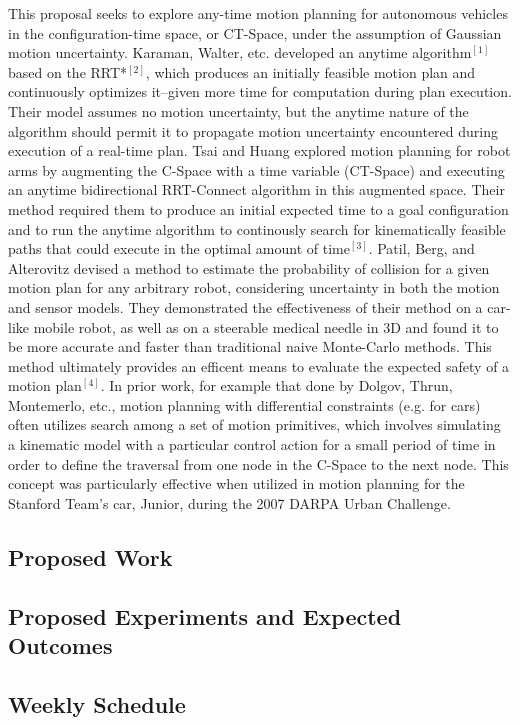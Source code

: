 \documentclass[12pt]{article}
\begin{document}
This proposal seeks to explore any-time motion planning for autonomous vehicles in the configuration-time space, or CT-Space, under the assumption of Gaussian motion uncertainty. Karaman, Walter, etc. developed an anytime algorithm$^{[1]}$ based on the RRT*$^{[2]}$, which produces an initially feasible motion plan and continuously optimizes it--given more time for computation during plan execution. Their model assumes no motion uncertainty, but the anytime nature of the algorithm should permit it to propagate motion uncertainty encountered during execution of a real-time plan. Tsai and Huang explored motion planning for robot arms by augmenting the C-Space with a time variable (CT-Space) and executing an anytime bidirectional RRT-Connect algorithm in this augmented space. Their method required them to produce an initial expected time to a goal configuration and to run the anytime algorithm to continously search for kinematically feasible paths that could execute in the optimal amount of time$^{[3]}$. Patil, Berg, and Alterovitz devised a method to estimate the probability of collision for a given motion plan for any arbitrary robot, considering uncertainty in both the motion and sensor models. They demonstrated the effectiveness of their method on a car-like mobile robot, as well as on a steerable medical needle in 3D and found it to be more accurate and faster than traditional naive Monte-Carlo methods. This method ultimately provides an efficent means to evaluate the expected safety of a motion plan$^{[4]}$. In prior work, for example that done by Dolgov, Thrun, Montemerlo, etc., motion planning with differential constraints (e.g. for cars) often utilizes search among a set of motion primitives, which involves simulating a kinematic model with a particular control action for a small period of time in order to define the traversal from one node in the C-Space to the next node. This concept was particularly effective when utilized in motion planning for the Stanford Team's car, Junior, during the 2007 DARPA Urban Challenge.

\subsection*{Proposed Work}

\subsection*{Proposed Experiments and Expected Outcomes}

\subsection*{Weekly Schedule}
\end{document}
